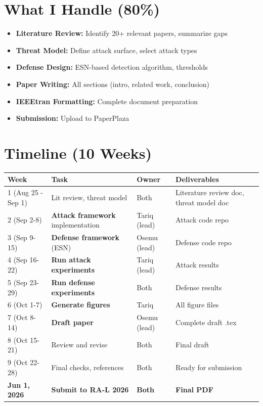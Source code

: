 \documentclass[conference]{IEEEtran}
\begin{document}
\section{What I Handle (80\%)}

\begin{itemize}
    \item \textbf{Literature Review:} Identify 20+ relevant papers, summarize gaps
    \item \textbf{Threat Model:} Define attack surface, select attack types
    \item \textbf{Defense Design:} ESN-based detection algorithm, thresholds
    \item \textbf{Paper Writing:} All sections (intro, related work, conclusion)
    \item \textbf{IEEEtran Formatting:} Complete document preparation
    \item \textbf{Submission:} Upload to PaperPlaza
\end{itemize}

\section{Timeline (10 Weeks)}

\begin{tabular}{llll}
\textbf{Week} & \textbf{Task} & \textbf{Owner} & \textbf{Deliverables} \\
\midrule
1 (Aug 25 - Sep 1) & Lit review, threat model & Both & Literature review doc, threat model doc \\
2 (Sep 2-8) & \textbf{Attack framework} implementation & Tariq (lead) & Attack code repo \\
3 (Sep 9-15) & \textbf{Defense framework} (ESN) & Osemu (lead) & Defense code repo \\
4 (Sep 16-22) & \textbf{Run attack experiments} & Tariq (lead) & Attack results \\
5 (Sep 23-29) & \textbf{Run defense experiments} & Both & Defense results \\
6 (Oct 1-7) & \textbf{Generate figures} & Tariq & All figure files \\
7 (Oct 8-14) & \textbf{Draft paper} & Osemu (lead) & Complete draft .tex \\
8 (Oct 15-21) & Review and revise & Both & Final draft \\
9 (Oct 22-28) & Final checks, references & Both & Ready for submission \\
\textbf{Jun 1, 2026} & \textbf{Submit to RA-L 2026} & \textbf{Both} & \textbf{Final PDF} \\
\bottomrule
\end{tabular}
\end{document}
